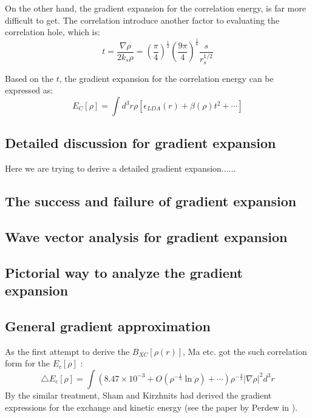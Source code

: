 On the other hand, the gradient expansion for the correlation energy, is far
more difficult to get. The correlation introduce another factor to evaluating
the correlation hole, which is:
\begin{equation}
 \label{eq:FIDFTeq:123}
t = \frac{\nabla\rho}{2k_{s}\rho} = \left( \frac{\pi}{4}\right)^{\frac{1}{2}}
\left( \frac{9\pi}{4}\right)^{\frac{1}{6}}
\frac{s}{r_{s}^{1/2}}
\end{equation}

Based on the $t$, the gradient expansion for the correlation energy can be
expressed as:
\begin{equation}
 \label{eq:FIDFTeq:124}
E_{C}[\rho] = \int d^{3}r \rho[\epsilon_{LDA}(r)+\beta(\rho) t^{2} + 
\cdots] 
\end{equation}

\subsection{Detailed discussion for gradient expansion}
\label{sec:Taylor_expansion_in_function}
%
%
%
%
Here we are trying to derive a detailed gradient expansion......


\subsection{The success and failure of gradient expansion}
\label{sec:success_failure_GEA}
%
%
%
%

\subsection{Wave vector analysis for gradient expansion}
\label{sec:wave_vector_analysis_GEA}
%
%
%
%


\subsection{Pictorial way to analyze the gradient expansion }
\label{sec:Pictorial_way_GEA}
%
%
%
%

\subsection{General gradient approximation}
\label{sec:GGA_in_function}
%
%
%
%
As the first attempt to derive the $B_{XC}[\rho(r)]$, Ma
etc.\cite{PhysRev.165.18} got the such correlation form for the
$E_{c}[\rho]$ :
\begin{equation}
\label{eq:FIDFTeq:95}
 \triangle E_{c}[\rho] = \int (8.47\times 10^{-3} +
 O(\rho^{-\frac{1}{3}}\ln\rho) + \cdots)\rho^{-\frac{4}{3}}|\nabla
  \rho|^{2}d^{3}r
\end{equation}
By the similar treatment, Sham and Kirzhnits had derived the gradient
expressions for the exchange and kinetic energy (see the paper by
Perdew in \cite{DFT_PAPERS_GATHERING}).

